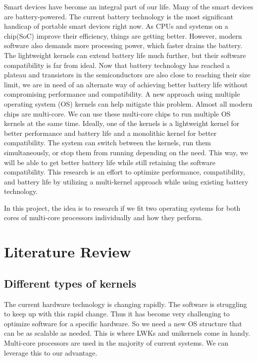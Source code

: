 \documentclass[11pt]{article}       %
\begin{document}
Smart devices have become an integral part of our life. Many of the smart devices are battery-powered. The current battery technology is the most significant handicap of portable smart devices right now. As CPUs and systems on a chip(SoC) improve their efficiency, things are getting better. However, modern software also demands more processing power, which faster drains the battery. The lightweight kernels can extend battery life much further, but their software compatibility is far from ideal. Now that battery technology has reached a plateau and transistors in the semiconductors are also close to reaching their size limit, we are in need of an alternate way of achieving better battery life without compromising performance and compatibility. A new approach using multiple operating system (OS) kernels can help mitigate this problem. Almost all modern chips are multi-core. We can use these multi-core chips to run multiple OS kernels at the same time. Ideally, one of the kernels is a lightweight kernel for better performance and battery life and a monolithic kernel for better compatibility. The system can switch between the kernels, run them simultaneously, or stop them from running depending on the need. This way, we will be able to get better battery life while still retaining the software compatibility. This research is an effort to optimize performance, compatibility, and battery life by utilizing a multi-kernel approach while using existing battery technology. 

In this project, the idea is to research if we fit two operating systems for both cores of multi-core processors individually and how they perform.

\section{Literature Review} \label{litrev}

\subsection{Different types of kernels}
The current hardware technology is changing rapidly. The software is struggling to keep up with this rapid change. Thus it has become very challenging to optimize software for a specific hardware\cite{DEL02}. So we need a new OS structure that can be as scalable as needed. This is where LWKs and unikernels come in handy. Multi-core processors are used in the majority of current systems. We can leverage this to our advantage.
\end{document}
